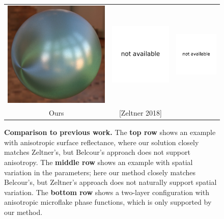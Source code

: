 \begin{figure}[t]
\begin{tabular}{ccc}
		\includegraphics[width=0.315\columnwidth]{img/validations/compare2/sphere_1024spp_60min.jpg} &
		\includegraphics[width=0.315\columnwidth]{img/validations/compare2/na.pdf} &
		\includegraphics[width=0.315\columnwidth]{img/validations/compare2/na.pdf} \\
		
		Ours &
		[Zeltner 2018] &
		\cite{Belcour2018}
	\end{tabular}
	\caption{\label{fig:compare-previous}
		\textbf{Comparison to previous work.} The \textbf{top row} shows an example with anisotropic surface reflectance, where our solution closely matches Zeltner's, but Belcour's approach does not support anisotropy. The \textbf{middle row} shows an example with spatial variation in the parameters; here our method closely matches Belcour's, but Zeltner's approach does not naturally support spatial variation. The \textbf{bottom row} shows a two-layer configuration with anisotropic microflake phase functions, which is only supported by our method.
	}
\end{figure}
